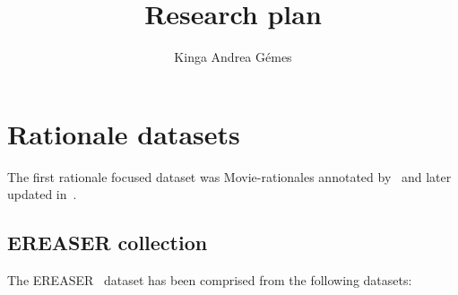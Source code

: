 \documentclass[]{article}
\title{Research plan}
\author{Kinga Andrea Gémes}
\begin{document}
\maketitle

\section{Rationale datasets}

The first rationale focused dataset was Movie-rationales annotated by~\cite{Zaidan:2007} and later updated in~\cite{Zaidan:2008}.

\subsection{EREASER collection}

The EREASER~\cite{DeYoung:2020} dataset has been comprised from the following datasets:
\end{document}
